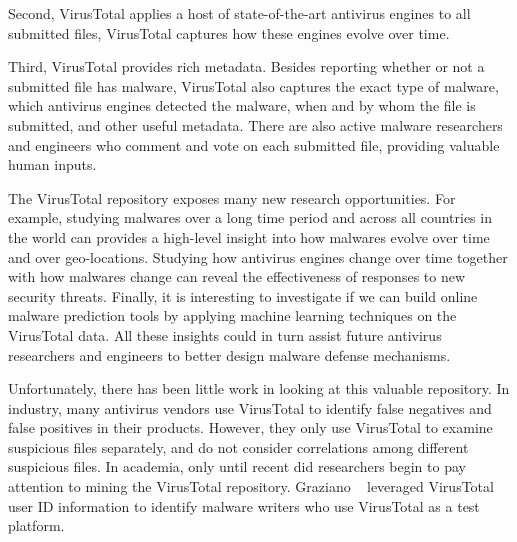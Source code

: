 Second, VirusTotal applies a host of state-of-the-art antivirus engines to all submitted files,
VirusTotal captures how these engines evolve over time.

Third, VirusTotal provides rich metadata. 
Besides reporting whether or not a submitted file has malware, 
VirusTotal also captures the exact type of malware, 
which antivirus engines detected the malware,
when and by whom the file is submitted,
and other useful metadata.
There are also active malware researchers and engineers
who comment and vote on each submitted file, 
providing valuable human inputs. 

The VirusTotal repository exposes many new research opportunities.
For example, studying malwares over a long time period and across all countries in the world 
can provides a high-level insight into how malwares evolve over time and over geo-locations.
Studying how antivirus engines change over time together with how malwares change can 
reveal the effectiveness of responses to new security threats.
Finally, it is interesting to investigate if we can build online malware prediction tools 
by applying machine learning techniques on the VirusTotal data.
All these insights could in turn assist future antivirus researchers and engineers
to better design malware defense mechanisms.

Unfortunately, there has been little work in looking at this valuable repository.
In industry, many antivirus vendors use VirusTotal to identify false negatives 
and false positives in their products. 
However, they only use VirusTotal to examine suspicious files separately, 
and do not consider correlations among different suspicious files. 
In academia, only until recent did researchers begin to pay attention to mining the VirusTotal repository. 
Graziano \etal~\cite{neeles} leveraged VirusTotal user ID information to identify malware writers 
who use VirusTotal as a test platform. 

